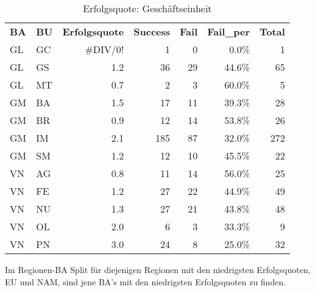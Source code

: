 \begin{table}[htbp]
	\centering
	\caption{Erfolgsquote: Geschäftseinheit}
	\begin{tabular}{llrrrrr}
		\textbf{BA} & \textbf{BU} & \multicolumn{1}{l}{\textbf{Erfolgsquote}} & \multicolumn{1}{l}{\textbf{Success}} & \multicolumn{1}{l}{\textbf{Fail}} & \multicolumn{1}{l}{\textbf{Fail\_per}} & \multicolumn{1}{l}{\textbf{Total}} \\
		GL    & GC    & \#DIV/0! & 1     & 0     & 0.0\% & 1 \\
		GL    & GS    & 1.2   & 36    & 29    & 44.6\% & 65 \\
		GL    & MT    & 0.7   & 2     & 3     & 60.0\% & 5 \\\hline
		GM    & BA    & 1.5   & 17    & 11    & 39.3\% & 28 \\
		GM    & BR    & 0.9   & 12    & 14    & 53.8\% & 26 \\
		GM    & IM    & 2.1   & 185   & 87    & 32.0\% & 272 \\
		GM    & SM    & 1.2   & 12    & 10    & 45.5\% & 22 \\\hline
		VN    & AG    & 0.8   & 11    & 14    & 56.0\% & 25 \\
		VN    & FE    & 1.2   & 27    & 22    & 44.9\% & 49 \\
		VN    & NU    & 1.3   & 27    & 21    & 43.8\% & 48 \\
		VN    & OL    & 2.0   & 6     & 3     & 33.3\% & 9 \\
		VN    & PN    & 3.0   & 24    & 8     & 25.0\% & 32 \\
	\end{tabular}%
	\label{tab:addlabel}%
\end{table}%
\newline
Im Regionen-BA Split für diejenigen Regionen mit den niedrigsten Erfolgsquoten, EU und NAM, sind jene BA's mit den niedrigsten Erfolgsquoten zu finden. 
